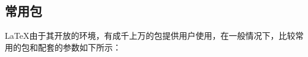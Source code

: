 \subsection{常用包}
\LaTeX{}由于其开放的环境，有成千上万的包提供用户使用，在一般情况下，比较常用的包和配套的参数如下所示：
\begin{texbreakcode}
    \usepackage{amsmath}%
    \usepackage{graphics}%
    \usepackage{graphicx}%
    \usepackage{subfigure}%
    \usepackage{wrapfig}%
    \graphicspath{{./}{./contents/}{./contents/fig/}}%
    \newcommand{\figpath}[1]{contents/fig/#1} %

    \usepackage{fontspec}%
    \usepackage[table]{xcolor}%
    \usepackage{enumitem}%
    \usepackage{float}%
    \usepackage[colorlinks,
                linkcolor=black,
                urlcolor=blue,
                anchorcolor=blue,
                citecolor=green]{hyperref}%

    \usepackage[most]{tcolorbox}%
    \usepackage[cache=true,outputdir=./out]{minted}%

    \usepackage[a4paper,left=4cm,right=4cm,top=3cm,bottom=1cm]{geometry}%
    \usepackage{appendix}%

    
    \usepackage[UTF8,fontset=windowsnew,heading=true]{ctex} %
    \usepackage{multirow} %
    \usepackage{pdfpages} %
    \usepackage{ulem} %
    \usepackage{fixltx2e} %

    \usepackage{adjustbox} %
    \usepackage{longtable}%
    \usepackage{nameref} %
\end{texbreakcode}

